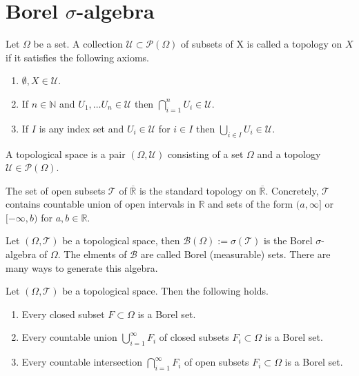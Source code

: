 \section{Borel \(\sigma\)-algebra}
\begin{definition}
    Let \(\Omega\) be a set. A collection \(\mathcal{U} \subset \mathcal{P}(\Omega)\) of subsets of X is called a topology on \(X\) if it satisfies the following axioms.
    \begin{enumerate}
        \item \(\emptyset, X \in \mathcal{U}\).
        \item If \(n \in \mathbb{N}\) and \(U_1, \dots U_n \in \mathcal{U}\) then \(\bigcap_{i=1}^n U_i \in \mathcal{U}\).
        \item If \(I\) is any index set and \(U_i \in \mathcal{U}\) for \(i \in I\) then \(\bigcup_{i \in I} U_i \in \mathcal{U}\).
    \end{enumerate}
    A topological space is a pair \((\Omega, \mathcal{U})\) consisting of a set \(\Omega\) and a topology \(\mathcal{U} \in \mathcal{P}(\Omega)\).
\end{definition}
\begin{example}
    The set of open subsets \(\mathcal{T}\) of \(\overline{\mathbb{R}}\) is the standard topology on \(\overline{\mathbb{R}}\). Concretely, \(\mathcal{T}\) contains countable union of open intervals in \(\mathbb{R}\) and sets of the form \((a, \infty]\) or \([-\infty, b)\) for \(a, b \in \mathbb{R}\).
\end{example}
\begin{definition}
    Let \((\Omega, \mathcal{T})\) be a topological space, then \(\mathcal{B}(\Omega) := \sigma(\mathcal{T})\) is the Borel \(\sigma\)-algebra of \(\Omega\). The elments of \(\mathcal{B}\) are called Borel (measurable) sets.
    There are many ways to generate this algebra.
\end{definition}
\begin{theorem}
    Let \((\Omega, \mathcal{T})\) be a topological space. Then the following holds.
    \begin{enumerate}
        \item Every closed subset \(F \subset \Omega\) is a Borel set.
        \item Every countable union \(\bigcup_{i=1}^\infty F_i\) of closed subsets \(F_i \subset \Omega\) is a Borel set.
        \item Every countable intersection \(\bigcap_{i=1}^\infty F_i\) of open subsets \(F_i \subset \Omega\) is a Borel set.
    \end{enumerate}
\end{theorem}
